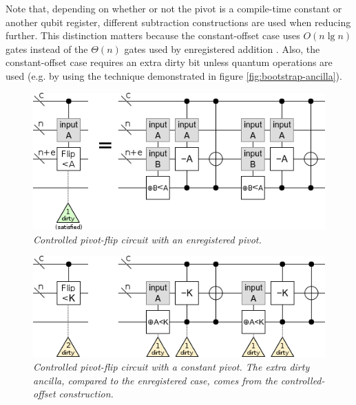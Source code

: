 \documentclass[twocolumn]{article}
\begin{document}
Note that, depending on whether or not the pivot is a compile-time constant or another qubit register, different subtraction constructions are used when reducing further.
This distinction matters because the constant-offset case uses $O(n \lg n)$ gates \cite{haner2016} instead of the $\Theta(n)$ gates used by enregistered addition \cite{takahashi2005}.
Also, the constant-offset case requires an extra dirty bit unless quantum operations are used (e.g. by using the technique demonstrated in figure \ref{fig:bootstrap-ancilla}).

\begin{figure}
  \centering
  \includegraphics[width=\linewidth]{assets/controlled-pivot-flip.png}
  \caption{\em
    Controlled pivot-flip circuit with an enregistered pivot.
  }
  \label{fig:controlled-pivot-flip}
\end{figure}

\begin{figure}
  \centering
  \includegraphics[width=\linewidth]{assets/controlled-const-pivot-flip.png}
  \caption{\em
    Controlled pivot-flip circuit with a constant pivot.
    The extra dirty ancilla, compared to the enregistered case, comes from the controlled-offset construction.
  }
  \label{fig:controlled-pivot-flip}
\end{figure}
\end{document}
